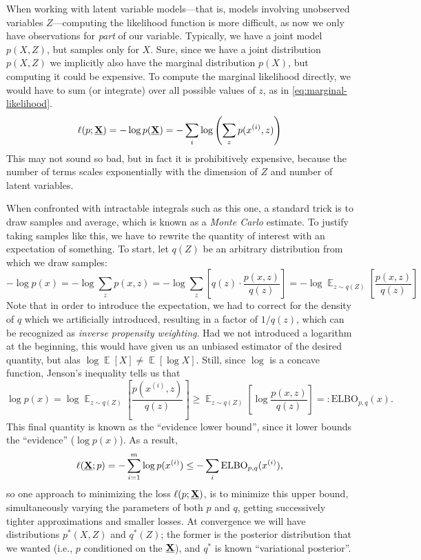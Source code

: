 \documentclass{article}
\theoremstyle{plain}
\theoremstyle{definition}
\theoremstyle{remark}
\DeclareMathOperator*{\Ex}{\mathbb{E}} %
\newcommand\mat[1]{\mathbf{#1}}
\begin{document}
When working with latent variable models---that is, models involving unobserved variables $Z$---computing the likelihood function is more difficult, as now we only have observations for \emph{part} of our variable. Typically, we have a joint model $p(X,Z)$, but samples only for $X$. Sure, since we have a joint distribution $p(X,Z)$ we implicitly also have the marginal distribution $p(X)$, but computing it could be expensive. To compute the marginal likelihood directly, we would have to sum (or integrate) over all possible values of $z$, as in \eqref{eq:marginal-likelihood}.
\begin{equation}
	\ell(p ; \xsamp) = - \log p(\xsamp) = - \sum_{i} \log \left(\sum_z p(x^{(i)}, z) \right) \label{eq:marginal-likelihood}
\end{equation}
This may not sound so bad, but in fact it is prohibitively expensive, because the number of terms scales exponentially with the dimension of $Z$ and number of latent variables. 

When confronted with intractable integrals such as this one, a standard trick is to draw samples and average, which is known as a \emph{Monte Carlo} estimate.
To justify taking samples like this, we have to rewrite the quantity of interest with an expectation of something. To start, let $q(Z)$ be an arbitrary distribution from which we draw samples:  
\begin{equation*}
	-\log p(x) = - \log \sum_z p(x, z) 
		= -\log \sum_z \left[ q(z) \cdot\frac{p(x, z)}{q(z)} \right] 
		= -\log \Ex_{z\sim q(Z)} \left[\frac{p(x, z)}{q(z)} \right] 
\end{equation*}
Note that in order to introduce the expectation, we had to correct for the density of $q$ which we artificially introduced, resulting in a factor of ${1}/{q(z)}$, which can be recognized as \emph{inverse propensity weighting}. 
Had we not introduced a logarithm at the beginning, this would have given us an unbiased estimator of the desired quantity, but alas $\log \Ex [X] \ne \Ex [\log X]$. Still, since $\log$ is a concave function, Jenson's inequality tells us that 
\[ \log p(x) = \log \Ex_{z\sim q(Z)} \left[\frac{p(x^{(i)}, z)}{q(z)} \right]
 	\ge \Ex_{z\sim q(Z)}\left[  \log \frac{p(x, z)}{q(z)} \right] =: \mathrm{ELBO}_{p,q}(x). \]
This final quantity is known as the ``evidence lower bound'', since it lower bounds the ``evidence'' ($\log p(x)$). As a result,
\[ \ell(\xsamp; p) = - \sum_{i=1}^m \log p(x^{(i)}) \le - \sum_i \mathrm{ELBO}_{p,q}(x^{(i)}), \] 
so one approach to minimizing the loss $\ell(p; \xsamp)$, is to minimize this upper bound, simultaneously varying the parameters of both $p$ and $q$, getting successively tighter approximations and smaller losses. 
At convergence we will have distributions $p^*(X,Z)$ and $q^*(Z)$; the former is the posterior distribution that we wanted (i.e., $p$ conditioned on the $\xsamp$), and $q^*$ is known ``variational posterior''.
\end{document}
